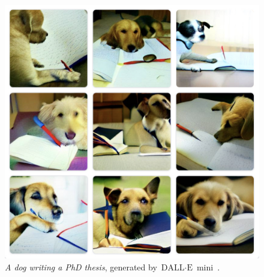 
\begin{figure}
  \centering
  \includegraphics[width=.8\textwidth]{figures/chapter01/dog_phd_thesis.jpeg}
  \caption{\textit{A dog writing a PhD thesis}, generated by $\text{DALL}\cdot\text{E}$ mini~\citep{Dayma_DALL_E_Mini_2021}.}
  \label{fig:dalle-mini}
\end{figure}


